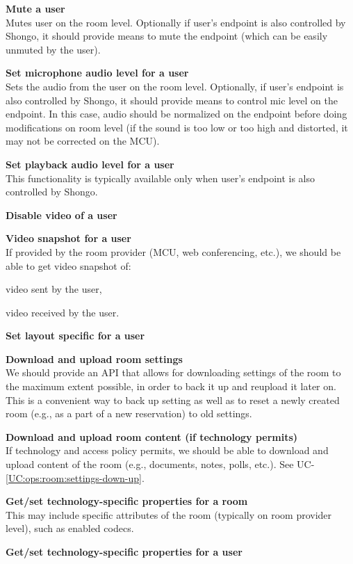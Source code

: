 \documentclass[a4paper]{report}
\makeatletter
\newcounter{UCcounter}
\newenvironment{UseCases}%
	{\begin{list}{\textbf{UC-\arabic{UCcounter}}}{\@nmbrlisttrue\def\@listctr{UCcounter}}}%
	{\end{list}}
\newcommand{\UClabel}[1]{\label{UC:#1}}
\newcommand{\UCref}[1]{UC-\ref{UC:#1}}
\newcommand{\UseCase}[2]{\item\UClabel{#2} \textbf{#1}\\}
\makeatother
\begin{document}
\begin{UseCases}
\UseCase{Mute a user}{ops:room:user-mute} Mutes user on the room level.
Optionally if user's endpoint is also controlled by Shongo, it should provide
means to mute the endpoint (which can be easily unmuted by the user).

\UseCase{Set microphone audio level for a user}{ops:room:user-miclevel}

Sets the audio from the user on the room level. Optionally, if user's endpoint
is also controlled by Shongo, it should provide means to control mic level on
the endpoint. In this case, audio should be normalized on the endpoint before
doing modifications on room level (if the sound is too low or too high and
distorted, it may not be corrected on the MCU).

\UseCase{Set playback audio level for a user}{ops:room:user-playlevel}

This functionality is typically available only when user's endpoint is also
controlled by Shongo.

\UseCase{Disable video of a user}{ops:room:user-video-off}

\UseCase{Video snapshot for a user}{ops:room:user-video-snap}

If provided by the room provider (MCU, web conferencing, etc.), we should be
able to get video snapshot of:

\begin{compactitem}

\item video sent by the user,

\item video received by the user.

\end{compactitem}


\UseCase{Set layout specific for a user}{ops:room:user-layout}

\UseCase{Download and upload room settings}{ops:room:settings-down-up}

We should provide an API that allows for downloading settings of the room to
the maximum extent possible, in order to back it up and reupload it later on.
This is a convenient way to back up setting as well as to reset a newly created
room (e.g., as a part of a new reservation) to old settings.

\UseCase{Download and upload room content (if technology
permits)}{ops:room:content-down-up}

If technology and access policy permits, we should be able to download and
upload content of the room (e.g., documents, notes, polls, etc.). See
\UCref{ops:room:settings-down-up}.

\UseCase{Get/set technology-specific properties for a
room}{ops:room:room-techspec}

This may include specific attributes of the room (typically on room provider
level), such as enabled codecs.

\UseCase{Get/set technology-specific properties for a
user}{ops:room:user-techspec}

\end{UseCases}
\end{document}

